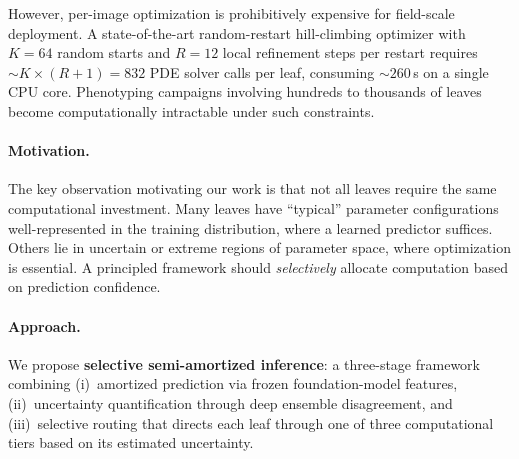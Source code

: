 \documentclass[11pt,a4paper]{article}
\begin{document}
However, per-image optimization is prohibitively expensive for field-scale deployment.
A state-of-the-art random-restart hill-climbing optimizer with $K=64$ random starts
and $R=12$ local refinement steps per restart requires ${\sim}K \times (R+1) = 832$
PDE solver calls per leaf, consuming ${\sim}260$\,s on a single CPU core.
Phenotyping campaigns involving hundreds to thousands of leaves become
computationally intractable under such constraints.

\paragraph{Motivation.}
The key observation motivating our work is that not all leaves require the same
computational investment. Many leaves have ``typical'' parameter configurations
well-represented in the training distribution, where a learned predictor suffices.
Others lie in uncertain or extreme regions of parameter space, where optimization
is essential. A principled framework should \emph{selectively} allocate computation
based on prediction confidence.

\paragraph{Approach.}
We propose \textbf{selective semi-amortized inference}: a three-stage framework
combining (i)~amortized prediction via frozen foundation-model features,
(ii)~uncertainty quantification through deep ensemble disagreement, and
(iii)~selective routing that directs each leaf through one of three computational
tiers based on its estimated uncertainty.
\end{document}
